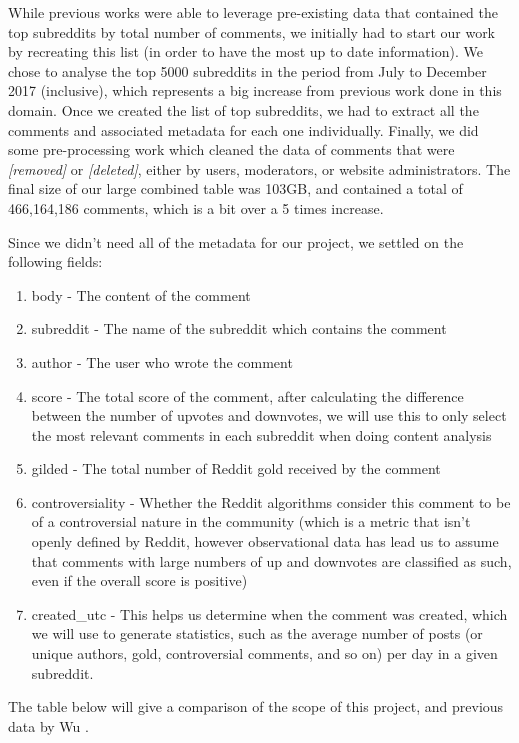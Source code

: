 \documentclass[bsc,frontabs,twoside,singlespacing,parskip,deptreport]{infthesis}
\begin{document}
While previous works were able to leverage pre-existing data that contained the top subreddits by total number of comments, we initially had to start our work by recreating this list (in order to have the most up to date information). We chose to analyse the top 5000 subreddits in the period from July to December 2017 (inclusive), which represents a big increase from previous work done in this domain. Once we created the list of top subreddits, we had to extract all the comments and associated metadata for each one individually. Finally, we did some pre-processing work which cleaned the data of comments that were \textit{[removed]} or \textit{[deleted]}, either by users, moderators, or website administrators. The final size of our large combined table was 103GB, and contained a total of 466,164,186 comments, which is a bit over a 5 times increase.

Since we didn't need all of the metadata for our project, we settled on the following fields: 

\begin{enumerate}
  \item body - The content of the comment
  \item subreddit - The name of the subreddit which contains the comment
  \item author - The user who wrote the comment
  \item score - The total score of the comment, after calculating the difference between the number of upvotes and downvotes, we will use this to only select the most relevant comments in each subreddit when doing content analysis
  \item gilded - The total number of Reddit gold received by the comment
  \item controversiality - Whether the Reddit algorithms consider this comment to be of a controversial nature in the community (which is a metric that isn't openly defined by Reddit, however observational data has lead us to assume that comments with large numbers of up and downvotes are classified as such, even if the overall score is positive)
  \item created\_utc - This helps us determine when the comment was created, which we will use to generate statistics, such as the average number of posts (or unique authors, gold, controversial comments, and so on) per day in a given subreddit.
\end{enumerate}

The table below will give a comparison of the scope of this project, and previous data by Wu \cite{masters}.
\end{document}
